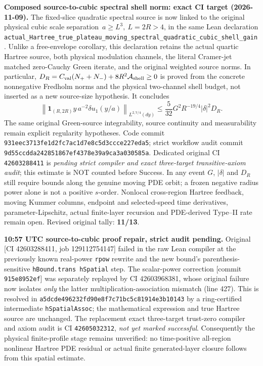 \documentclass[11pt]{amsart}
\begin{document}
\medskip
\noindent\textbf{Composed source-to-cubic spectral shell norm: exact CI target (2026-11-09).}
The fixed-slice quadratic spectral source is now linked to the original
physical cubic scale separation \(\,a\ge L^3,\ L=2R>4\),
in the same Lean declaration
\texttt{actual\_Hartree\_true\_plateau\_moving\_spectral\_quadratic\_cubic\_shell\_gain}.
Unlike a free-envelope corollary, this declaration retains the actual
quartic Hartree source, both physical modulation channels, the literal
Cramer-jet matched zero-Cauchy Green iterate, and the original
weighted source norms. In particular,
\(D_R=C_{\rm val}(N_++N_-)+8R^2{\mathcal A}_{\rm shell}\ge0\)
is proved from the concrete nonnegative Fredholm norms and the
physical two-channel shell budget, not inserted as a new source-size
hypothesis. It concludes
\[
 \left\|\mathbf{1}_{(R,2R)}y\,a^{-2}\delta u_1(y/a)
       \right\|_{L^{2,7/4}(dy)}
 \le\frac5{32}G^2R^{-19/4}|\delta|^2D_R.
\]
The same original Green-source integrability, source continuity and
measurability remain explicit regularity hypotheses.
Code commit \texttt{931eec3713fe1d2fc7ac1d7e8c5d3ccce227eda5};
strict workflow audit commit
\texttt{9d55ccdda242851867ef4378e39a9ca3a030585a}.
Dedicated original CI
\texttt{42603288411} is \emph{pending strict compiler and exact
three-target transitive-axiom audit}; this estimate is NOT counted
before Success. In any event \(G\), \(|\delta|\) and \(D_R\)
still require bounds along the genuine moving PDE orbit; a frozen
negative radius power alone is not a positive \(s\)-order.
Nonlocal cross-region Hartree feedback, moving Kummer columns,
endpoint and selected-speed time derivatives, parameter-Lipschitz,
actual finite-layer recursion and PDE-derived Type--II rate remain
open. Revised original tally: \textbf{11/13}.


\medskip
\noindent\textbf{10:57 UTC source-to-cubic proof repair, strict audit pending.}
Original [CI 42603288411, job 129112754147] failed in the raw
Lean compiler at the previously known real-power
\texttt{rpow} rewrite and the new bound's parenthesis-sensitive
\texttt{hBound.trans hSpatial} step.
The scalar-power correction [commit \texttt{915e8952ef}]
was separately replayed by CI 42603968381, whose original
failure now isolates \emph{only} the latter multiplication-association
mismatch (line 427). This is resolved in
\texttt{a5dcde496232fd90e8f7c71bc5c81914e3b10143}
by a ring-certified intermediate \texttt{hSpatialAssoc};
the mathematical expression and true Hartree source are unchanged.
The replacement exact three-target trust-zero compiler and axiom audit
is CI \texttt{42605032312}, \emph{not yet marked successful}.
Consequently the physical finite-profile stage remains unverified:
no time-positive all-region nonlinear Hartree PDE residual or actual
finite generated-layer closure follows from this spatial estimate.
\end{document}
